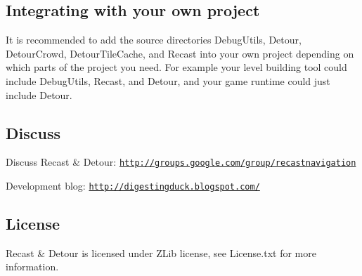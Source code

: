 \subsection*{Integrating with your own project}

It is recommended to add the source directories {\ttfamily Debug\+Utils}, {\ttfamily Detour}, {\ttfamily Detour\+Crowd}, {\ttfamily Detour\+Tile\+Cache}, and {\ttfamily Recast} into your own project depending on which parts of the project you need. For example your level building tool could include Debug\+Utils, Recast, and Detour, and your game runtime could just include Detour.

\subsection*{Discuss}


\begin{DoxyItemize}
\item Discuss Recast \& Detour\+: \href{http://groups.google.com/group/recastnavigation}{\tt http\+://groups.\+google.\+com/group/recastnavigation}
\item Development blog\+: \href{http://digestingduck.blogspot.com/}{\tt http\+://digestingduck.\+blogspot.\+com/}
\end{DoxyItemize}

\subsection*{License}

Recast \& Detour is licensed under Z\+Lib license, see License.\+txt for more information. 